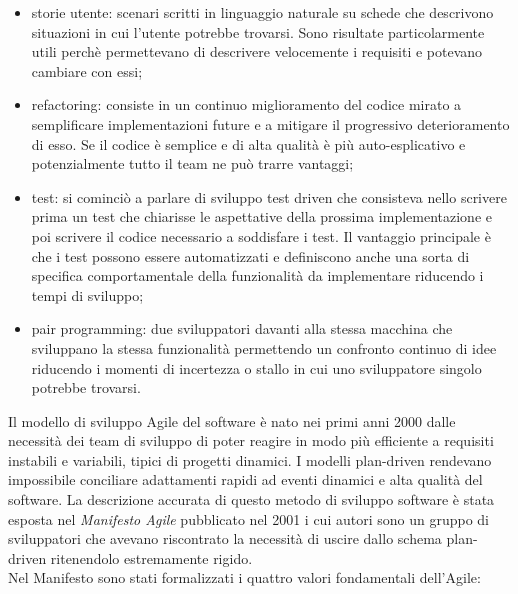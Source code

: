 \documentclass[target=bach,aauheader=,style=]{thud}
\begin{document}
\begin{itemize}
    \item storie utente: scenari scritti in linguaggio naturale su schede che descrivono situazioni in cui l'utente potrebbe trovarsi.
    Sono risultate particolarmente utili perchè permettevano di descrivere velocemente i requisiti e potevano cambiare con essi;
    \item refactoring: consiste in un continuo miglioramento del codice mirato a semplificare implementazioni future e a mitigare
    il progressivo deterioramento di esso. Se il codice è semplice e di alta qualità è più auto-esplicativo e potenzialmente tutto il
    team ne può trarre vantaggi;
    \item test: si cominciò a parlare di sviluppo test driven che consisteva nello scrivere prima un test che chiarisse le aspettative
    della prossima implementazione e poi scrivere il codice necessario a soddisfare i test. Il vantaggio principale è che i test possono
    essere automatizzati e definiscono anche una sorta di specifica comportamentale della funzionalità da implementare riducendo i tempi
    di sviluppo;
    \item pair programming: due sviluppatori davanti alla stessa macchina che sviluppano la stessa funzionalità permettendo un confronto
    continuo di idee riducendo i momenti di incertezza o stallo in cui uno sviluppatore singolo potrebbe trovarsi.
\end{itemize}
\par Il modello di sviluppo Agile del software è nato nei primi anni 2000 dalle necessità dei team di sviluppo di poter reagire in
modo più efficiente a requisiti instabili e variabili, tipici di progetti dinamici. I modelli plan-driven rendevano impossibile conciliare
adattamenti rapidi ad eventi dinamici e alta qualità del software.
La descrizione accurata di questo metodo di sviluppo software è stata esposta nel \textit{Manifesto Agile}\cite{beck2001agile} pubblicato nel 2001 i cui
autori sono un gruppo di sviluppatori che avevano riscontrato la necessità di uscire dallo schema plan-driven ritenendolo estremamente rigido.\\
Nel Manifesto sono stati formalizzati i quattro valori fondamentali dell'Agile:
\end{document}
